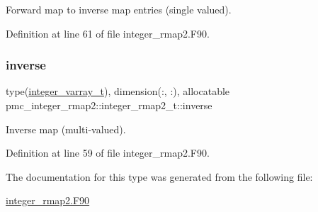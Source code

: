 Forward map to inverse map entries (single valued). 



Definition at line 61 of file integer\+\_\+rmap2.\+F90.

\mbox{\label{structpmc__integer__rmap2_1_1integer__rmap2__t_a78d779decd5d0e3b31cd33dfea9f51db}} 
\subsubsection{\texorpdfstring{inverse}{inverse}}
{\footnotesize\ttfamily type(\mbox{\hyperlink{structpmc__integer__varray_1_1integer__varray__t}{integer\+\_\+varray\+\_\+t}}), dimension(\+:, \+:), allocatable pmc\+\_\+integer\+\_\+rmap2\+::integer\+\_\+rmap2\+\_\+t\+::inverse}



Inverse map (multi-\/valued). 



Definition at line 59 of file integer\+\_\+rmap2.\+F90.



The documentation for this type was generated from the following file\+:\begin{DoxyCompactItemize}
\item 
\mbox{\hyperlink{integer__rmap2_8_f90}{integer\+\_\+rmap2.\+F90}}\end{DoxyCompactItemize}
